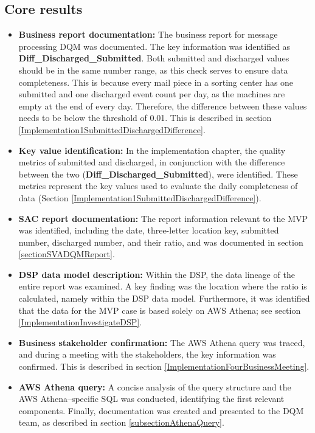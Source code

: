 \subsection*{Core results}
\begin{itemize}
    
\item \textbf{Business report documentation:} The business report for message processing DQM was documented. The key information was identified as \textbf{Diff\_Discharged\_Submitted}. Both submitted and discharged values should be in the same number range, as this check serves to ensure data completeness. This is because every mail piece in a sorting center has one submitted and one discharged event count per day, as the machines are empty at the end of every day. Therefore, the difference between these values needs to be below the threshold of 0.01. This is described in section \ref{Implementation1SubmittedDischargedDifference}.

\item \textbf{Key value identification:} In the implementation chapter, the quality metrics of submitted and discharged, in conjunction with the difference between the two (\textbf{Diff\_Discharged\_Submitted}), were identified. These metrics represent the key values used to evaluate the daily completeness of data (Section \ref{Implementation1SubmittedDischargedDifference}).

\item \textbf{SAC report documentation:} The report information relevant to the MVP was identified, including the date, three-letter location key, submitted number, discharged number, and their ratio, and was documented in section \ref{sectionSVADQMReport}.

\item \textbf{DSP data model description:} Within the DSP, the data lineage of the entire report was examined. A key finding was the location where the ratio is calculated, namely within the DSP data model. Furthermore, it was identified that the data for the MVP case is based solely on AWS Athena; see section \ref{ImplementationInvestigateDSP}.

\item \textbf{Business stakeholder confirmation:} The AWS Athena query was traced, and during a meeting with the stakeholders, the key information was confirmed. This is described in section \ref{ImplementationFourBusinessMeeting}.

\item \textbf{AWS Athena query:} A concise analysis of the query structure and the AWS Athena–specific SQL was conducted, identifying the first relevant components. Finally, documentation was created and presented to the DQM team, as described in section \ref{subsectionAthenaQuery}.


\end{itemize}
